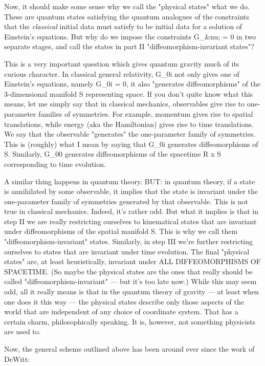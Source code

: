 Now, it should make some sense why we call the "physical states" what we
do.  These are quantum states satisfying the quantum analogues of the
constraints that the \emph{classical} initial data must satisfy to be initial
data for a solution of Einstein's equations.  But why do we impose the
constraints G_{\mu  &nu;} = 0 in two separate stages, and call the states in
part II "diffeomorphism-invariant states"?

This is a very important question which gives quantum gravity much of
its curious character.  In classical general relativity, G_{0i} not only
gives one of Einstein's equations, namely G_{0i} = 0, it also "generates
diffeomorphisms" of the 3-dimensional manifold S representing space.  If
you don't quite know what this means, let me simply say that in
classical mechanics, observables give rise to one-parameter families of
symmetries.  For example, momentum gives rise to spatial translations, while
energy (aka the Hamiltonian) gives rise to time translations.  We say
that the observable "generates" the one-parameter family of symmetries.
This is (roughly) what I mean by saying that G_{0i} generates
diffeomorphisms of S.  Similarly, G_{00} generates diffeomorphisms of
the spacetime R x S corresponding to time evolution.

A similar thing happens in quantum theory.  BUT: in quantum theory, if a
state is annihilated by some observable, it implies that the state is
invariant under the one-parameter family of symmetries generated by that
observable.  This is not true in classical mechanics.  Indeed, it's
rather odd.  But what it implies is that in step II we are really
restricting ourselves to kinematical states that are invariant under
diffeomorphisms of the spatial manifold S.  This is why we call them
"diffeomorphism-invariant" states.  Similarly, in step III we're further
restricting ourselves to states that are invariant under time evolution.
The final "physical states" are, at least heuristically, invariant under
ALL DIFFEOMORPHISMS OF SPACETIME.  (So maybe the physical states are the
ones that really should be called "diffeomorphism-invariant" --- but
it's too late now.)  While this may seem odd, all it really means is
that in the quantum theory of gravity --- at least when one does it this
way --- the physical states describe only those aspects of the world
that are independent of any choice of coordinate system.  That has a
certain charm, philosophically speaking.  It is, however, not something
physicists are used to.

Now, the general scheme outlined above has been around ever since the
work of DeWitt:

